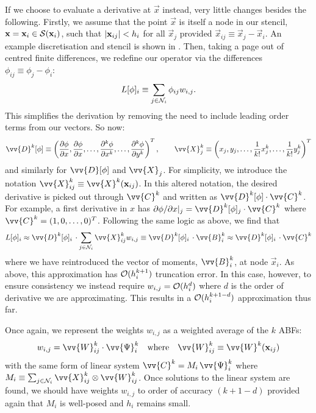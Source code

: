 If we choose to evaluate a derivative at $\vec{x}$ instead, very little changes besides the following. Firstly, we assume that the point $\vec{x}$ is itself a node in our stencil, $\mathbf{x} = \mathbf{x}_i \in \mathcal{S}(\mathbf{x}_i)$, such that $\abs{\mathbf{x}_{ij}} < h_i$ for all $\vec{x}_j$ provided $\vec{x}_{ij} \equiv \vec{x}_j - \vec{x}_i$. An example discretisation and stencil is shown in . Then, taking a page out of centred finite differences, we redefine our operator via the differences $\phi_{ij} \equiv \phi_j - \phi_i$:
\begin{equation} \label{eqn:labfm-L}
L[\phi]_i \equiv \sum_{j \in \mathcal{N}_i} \phi_{ij} w_{i, j}.
\end{equation}
This simplifies the derivation by removing the need to include leading order terms from our vectors. So now:
\begin{equation}
\vv{D}^k[\phi] \equiv \left(\pdv{\phi}{x}, \pdv{\phi}{x}, \dots, \pdv[k]{\phi}{x}, \dots, \pdv[k]{\phi}{y} \right)^T,
\qquad
\vv{X}^k_j \equiv \left(x_j, y_j, \dots, \frac{1}{k!} x_j^k, \dots, \frac{1}{k!} y_j^k \right)^T
\end{equation}
and similarly for $\vv{D}[\phi]$ and $\vv{X}_j$. For simplicity, we introduce the notation $\vv{X}^k_{ij} \equiv \vv{X}^k(\vec{x}_{ij})$. In this altered notation, the desired derivative is picked out through $\vv{C}^k$ and written as $\vv{D}^k[\phi] \cdot \vv{C}^k$. For example, a first derivative in $x$ has $\partial \phi / \partial x |_j = \vv{D}^k[\phi]_j \cdot \vv{C}^k$ where $\vv{C}^k = (1, 0, \dots, 0)^T$. Following the same logic as above, we find that
\begin{align}
L[\phi]_i
\approx \vv{D}^k[\phi]_i \, \cdot \sum_{j \in \cl{N}_i} \vv{X}^k_{ij} w_{i, j}
\equiv \vv{D}^k[\phi]_i \, \cdot \vv{B}^k_i \approx \vv{D}^k[\phi]_i \, \cdot \vv{C}^k
\end{align}
where we have reintroduced the vector of moments, $\vv{B}^k_i$, at node $\vec{x}_i$. As above, this approximation has $\mathcal{O}(h_i^{k + 1})$ truncation error. In this case, however, to ensure consistency we instead require $w_{i, j} = \mathcal{O}(h_i^d)$ where $d$ is the order of derivative we are approximating. This results in a $\mathcal{O}(h_i^{k + 1 - d})$ approximation thus far.

Once again, we represent the weights $w_{i, j}$ as a weighted average of the $k$ ABFs:
\begin{equation}
w_{i, j} = \vv{W}^k_{ij} \cdot \vv{\Psi}^k_i
\quad \text{where} \quad
\vv{W}^k_{ij} \equiv \vv{W}^k(\vec{x}_{ij})
\end{equation}
with the same form of linear system $\vv{C}^k = M_i \, \vv{\Psi}^k_i$ where $M_i \equiv \sum_{j \in \cl{N}_i} \vv{X}^k_{ij} \otimes \vv{W}^k_{ij}$. Once solutions to the linear system are found, we should have weights $w_{i, j}$ to order of accuracy $(k + 1 - d)$ provided again that $M_i$ is well-posed and $h_i$ remains small.




